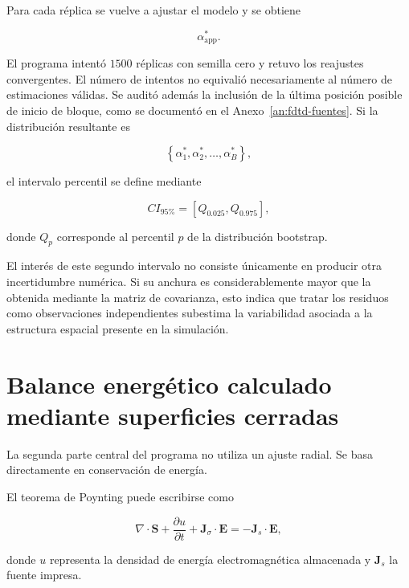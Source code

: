 Para cada réplica se vuelve a ajustar el modelo y se obtiene

\begin{equation}
\alpha_{\mathrm{app}}^{*}.
\end{equation}

El programa intentó $1500$ réplicas con semilla cero y retuvo los reajustes convergentes. El número de intentos no equivalió necesariamente al número de estimaciones válidas. Se auditó además la inclusión de la última posición posible de inicio de bloque, como se documentó en el Anexo~\ref{an:fdtd-fuentes}. Si la distribución resultante es

\begin{equation}
\left\{
\alpha_1^{*},
\alpha_2^{*},
\ldots,
\alpha_B^{*}
\right\},
\end{equation}

el intervalo percentil se define mediante

\begin{equation}
CI_{95\%}
=
\left[
Q_{0.025},
Q_{0.975}
\right],
\label{eq:CI_bootstrap}
\end{equation}

donde $Q_p$ corresponde al percentil $p$ de la distribución bootstrap.

El interés de este segundo intervalo no consiste únicamente en producir otra incertidumbre numérica. Si su anchura es considerablemente mayor que la obtenida mediante la matriz de covarianza, esto indica que tratar los residuos como observaciones independientes subestima la variabilidad asociada a la estructura espacial presente en la simulación.

\section{Balance energético calculado mediante superficies cerradas}

La segunda parte central del programa no utiliza un ajuste radial. Se basa directamente en conservación de energía.

El teorema de Poynting puede escribirse como

\begin{equation}
\nabla\cdot\mathbf{S}
+
\frac{\partial u}{\partial t}
+
\mathbf{J}_{\sigma}\cdot\mathbf{E}
=
-\mathbf{J}_s\cdot\mathbf{E},
\label{eq:poynting_diferencial}
\end{equation}

donde $u$ representa la densidad de energía electromagnética almacenada y $\mathbf{J}_s$ la fuente impresa.

